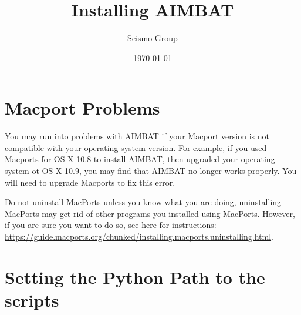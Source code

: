 \documentclass[letterpaper,10pt]{article}
\title{Installing AIMBAT}
\author{Seismo Group}
\date{\today}
\begin{document}
\maketitle


\section{Macport Problems}

You may run into problems with AIMBAT if your Macport version is not compatible with your operating system version. For example, if you used Macports for OS X 10.8 to install AIMBAT, then upgraded your operating system ot OS X 10.9, you may find that AIMBAT no longer works properly. You will need to upgrade Macports to fix this error.

Do not uninstall MacPorts unless you know what you are doing, uninstalling MacPorts may get rid of other programs you installed using MacPorts. However, if you are sure you want to do so, see here for instructions: \url{https://guide.macports.org/chunked/installing.macports.uninstalling.html}. 





\section{Setting the Python Path to the scripts}
\end{document}
